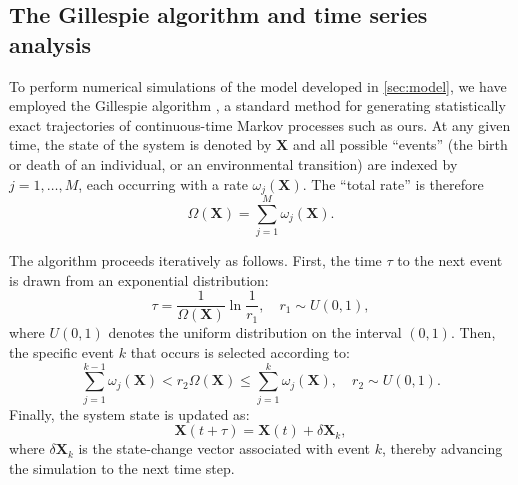 \documentclass[aps,pre,reprint,10pt,superscriptaddress]{revtex4-2}
\begin{document}
\begin{appendices}

    \setcounter{equation}{0}
    \setcounter{figure}{0}
    \setcounter{table}{0}
    \renewcommand{\theequation}{A\arabic{equation}}
    \renewcommand{\thefigure}{A\arabic{figure}}
    \renewcommand{\thetable}{A\arabic{table}}

    \section{The Gillespie algorithm and time series analysis} \label{sec:gillespie_algorithm}

    To perform numerical simulations of the model developed in \cref{sec:model}, we have employed the Gillespie algorithm \cite{toralStochasticNumericalMethods}, a standard method for generating statistically exact trajectories of continuous-time Markov processes such as ours. At any given time, the state of the system is denoted by $\mathbf{X}$ and all possible ``events'' (the birth or death of an individual, or an environmental transition) are indexed by $j=1,\dots,M$, each occurring with a rate $\omega_j(\mathbf{X})$. The ``total rate'' is therefore
    \begin{equation}
        \Omega(\mathbf{X})=\sum_{j=1}^M\omega_j(\mathbf{X}).
    \end{equation}

    The algorithm proceeds iteratively as follows. First, the time $\tau$ to the next event is drawn from an exponential distribution:
    \begin{equation}
        \tau=\frac{1}{\Omega(\mathbf{X})}\ln\frac{1}{r_1},\quad r_1\sim U(0,1),
    \end{equation}
    where $U(0,1)$ denotes the uniform distribution on the interval $(0,1)$. Then, the specific event $k$ that occurs is selected according to:
    \begin{equation}
        \sum_{j=1}^{k-1}\omega_j(\mathbf{X})<r_2\Omega(\mathbf{X})\le\sum_{j=1}^{k}\omega_j(\mathbf{X}),\quad r_2\sim U(0,1).
    \end{equation}
    Finally, the system state is updated as:
    \begin{equation}
        \mathbf{X}(t+\tau)=\mathbf{X}(t)+\delta\mathbf{X}_k,
    \end{equation}
    where $\delta\mathbf{X}_k$ is the state-change vector associated with event $k$, thereby advancing the simulation to the next time step.


\end{appendices}
\end{document}
